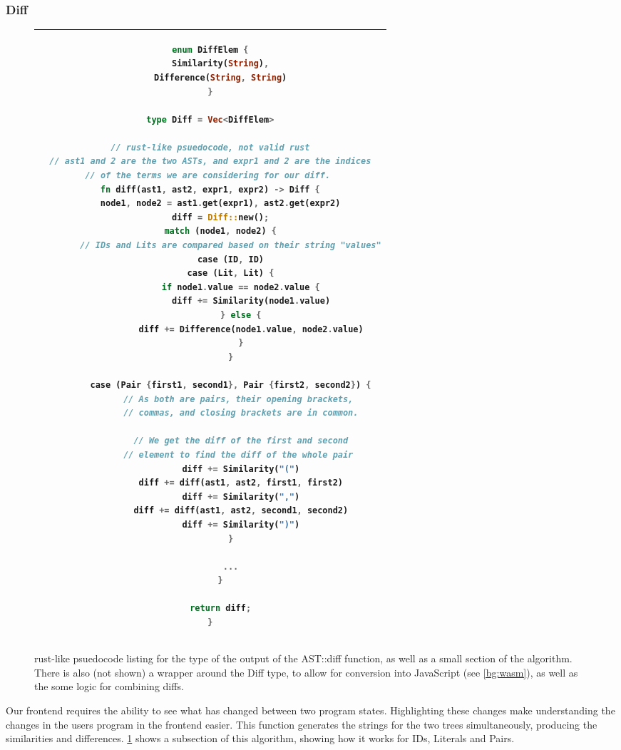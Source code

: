 \subsubsection{Diff}
\begin{figure}[t]
    \centering
    \begin{tabular}{|c|}
        \hline
    \begin{lstlisting}[language=Rust]
enum DiffElem {
    Similarity(String),
    Difference(String, String)
}

type Diff = Vec<DiffElem>

// rust-like psuedocode, not valid rust
// ast1 and 2 are the two ASTs, and expr1 and 2 are the indices
// of the terms we are considering for our diff. 
fn diff(ast1, ast2, expr1, expr2) -> Diff {
    node1, node2 = ast1.get(expr1), ast2.get(expr2)
    diff = Diff::new();
    match (node1, node2) {
        // IDs and Lits are compared based on their string "values"
        case (ID, ID)
        case (Lit, Lit) {
            if node1.value == node2.value {
                diff += Similarity(node1.value)
            } else {
                diff += Difference(node1.value, node2.value)
            }
        }

        case (Pair {first1, second1}, Pair {first2, second2}) {
            // As both are pairs, their opening brackets, 
            // commas, and closing brackets are in common.

            // We get the diff of the first and second
            // element to find the diff of the whole pair 
            diff += Similarity("(")
            diff += diff(ast1, ast2, first1, first2)
            diff += Similarity(",")
            diff += diff(ast1, ast2, second1, second2)
            diff += Similarity(")")
        }

        ...
    }
    
    return diff;
}
    \end{lstlisting}
    \\\hline
    \end{tabular}
    \caption{rust-like psuedocode listing for the type of the output of the AST::diff function, as well as a small section of the algorithm. There is also (not shown) a wrapper around the Diff type, to allow for conversion into JavaScript (see \ref{bg:wasm}), as well as the some logic for combining diffs.}
    \label{fig:diff_list}
\end{figure}

\label{paragraph:diff} Our frontend requires the ability to see what has changed between two program states. Highlighting these changes make understanding the changes in the users program in the frontend easier. This function generates the strings for the two trees simultaneously, producing the similarities and differences. \ref{fig:diff_list} shows a subsection of this algorithm, showing how it works for IDs, Literals and Pairs.

